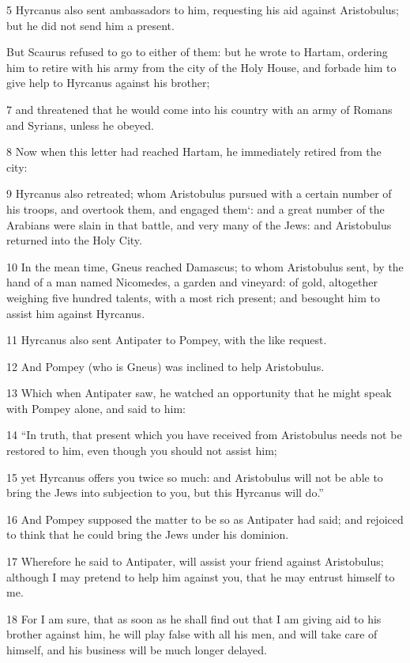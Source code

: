 5 Hyrcanus also sent ambassadors to him, requesting his aid against Aristobulus; but he did not send him a present. 

But Scaurus refused to go to either of them: but he wrote to Hartam, ordering him to retire with his army from the city of the Holy House, and forbade him to give help to Hyrcanus against his brother; 

7 and threatened that he would come into his country with an army of Romans and Syrians, unless he obeyed. 

8 Now when this letter had reached Hartam, he immediately retired from the city: 

9 Hyrcanus also retreated; whom Aristobulus pursued with a certain number of his troops, and overtook them, and engaged them‘: and a great number of the Arabians were slain in that battle, and very many of the Jews: and Aristobulus returned into the Holy City.

10 In the mean time, Gneus reached Damascus; to whom Aristobulus sent, by the hand of a man named Nicomedes, a garden and vineyard: of gold, altogether weighing five hundred talents, with a most rich present; and besought him to assist him against Hyrcanus. 

11 Hyrcanus also sent Antipater to Pompey, with the like request. 

12 And Pompey (who is Gneus) was inclined to help Aristobulus. 

13 Which when Antipater saw, he watched an opportunity that he might speak with Pompey alone, and said to him: 

14 “In truth, that present which you have received from Aristobulus needs not be restored to him, even though you should not assist him; 

15 yet Hyrcanus offers you twice so much: and Aristobulus will not be able to bring the Jews into subjection to you, but this Hyrcanus will do.” 

16 And Pompey supposed the matter to be so as Antipater had said; and rejoiced to think that he could bring the Jews under his dominion. 

17 Wherefore he said to Antipater, will assist your friend against Aristobulus; although I may pretend to help him against you, that he may entrust himself to me. 

18 For I am sure, that as soon as he shall find out that I am giving aid to his brother against him, he will play false with all his men, and will take care of himself, and his business will be much longer delayed. 

